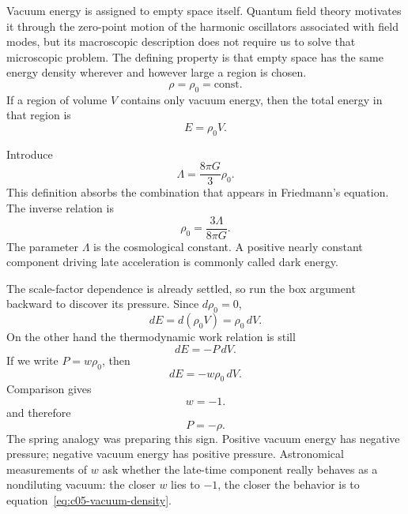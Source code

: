 Vacuum energy is assigned to empty space itself. Quantum field theory motivates it through the zero-point motion of the harmonic oscillators associated with field modes, but its macroscopic description does not require us to solve that microscopic problem. The defining property is that empty space has the same energy density wherever and however large a region is chosen.
\begin{equation}
\rho=\rho_0=\text{const.}
\label{eq:c05-vacuum-density}
\end{equation}
If a region of volume \(V\) contains only vacuum energy, then the total energy in that region is
\begin{equation}
E=\rho_0 V.
\end{equation}
\begin{classroomqa}
\end{classroomqa}

Introduce
\begin{equation}
\Lambda=\frac{8\pi G}{3}\rho_0.
\label{eq:c05-lambda-definition}
\end{equation}
This definition absorbs the combination that appears in Friedmann's equation. The inverse relation is
\begin{equation}
\rho_0=\frac{3\Lambda}{8\pi G}.
\end{equation}
The parameter \(\Lambda\) is the cosmological constant. A positive nearly constant component driving late acceleration is commonly called dark energy.

The scale-factor dependence is already settled, so run the box argument backward to discover its pressure. Since \(d\rho_0=0\),
\begin{equation}
dE=d(\rho_0V)=\rho_0\,dV.
\end{equation}
On the other hand the thermodynamic work relation is still
\begin{equation}
dE=-P\,dV.
\end{equation}
If we write \(P=w\rho_0\), then
\begin{equation}
dE=-w\rho_0\,dV.
\end{equation}
Comparison gives
\begin{equation}
w=-1.
\end{equation}
and therefore
\begin{equation}
P=-\rho.
\end{equation}
The spring analogy was preparing this sign. Positive vacuum energy has negative pressure; negative vacuum energy has positive pressure. Astronomical measurements of \(w\) ask whether the late-time component really behaves as a nondiluting vacuum: the closer \(w\) lies to \(-1\), the closer the behavior is to equation~\eqref{eq:c05-vacuum-density}.

